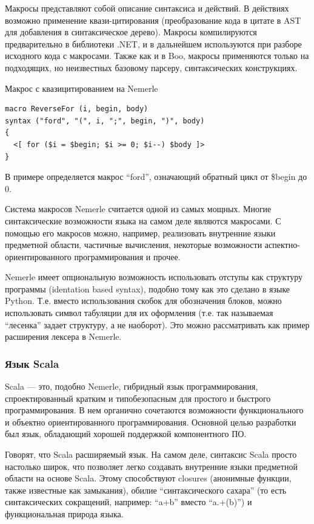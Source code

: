 \documentclass[a4paper,12pt]{article}
\begin{document}
Макросы представляют собой описание синтаксиса и действий. В действиях
возможно применение квази-цитирования (преобразование кода в цитате в AST для
добавления в синтаксическое дерево). Макросы компилируются предварительно в
библиотеки .NET, и в дальнейшем используются при разборе исходного кода с
макросами. Также как и в Boo, макросы применяются только на подходящих, но
неизвестных базовому парсеру, синтаксических конструкциях.

\begin{example}
Макрос с квазицитированием на Nemerle
\end{example}
\begin{verbatim}
macro ReverseFor (i, begin, body) 
syntax ("ford", "(", i, ";", begin, ")", body)
{
  <[ for ($i = $begin; $i >= 0; $i--) $body ]>
}
\end{verbatim}
В примере определяется макрос ``ford'', означающий обратный цикл от \$begin до
0.

Система макросов Nemerle считается одной из самых мощных. Многие
синтаксические возможности языка на самом деле являются макросами. С помощью
его макросов можно, например, реализовать внутренние языки предметной области,
частичные вычисления, некоторые возможности аспектно-ориентированного
программирования и прочее.

Nemerle имеет опциональную возможность использовать отступы как структуру
программы (identation based syntax), подобно тому как это сделано в языке
Python. Т.е. вместо использования скобок для обозначения блоков, можно
использовать символ табуляции для их оформления (т.е. так называемая
``лесенка'' задает структуру, а не наоборот). Это можно рассматривать как
пример расширения лексера в Nemerle.

\subsubsection*{Язык Scala}
Scala — это, подобно Nemerle, гибридный язык программирования, спроектированный
кратким и типобезопасным для простого и быстрого программирования. В нем органично
сочетаются возможности функционального и объектно ориентированного
программирования. Основной целью разработки был язык, обладающий хорошей
поддержкой компонентного ПО.

Говорят, что Scala расширяемый язык. На самом деле, синтаксис Scala просто
настолько широк, что позволяет легко создавать внутренние языки предметной
области на основе Scala. Этому способствуют closures (анонимные функции, также
известные как замыкания), обилие ``синтаксического сахара'' (то есть
синтаксических сокращений, например: ``a+b'' вместо ``a.+(b)'') и
функциональная природа языка.
\end{document}
